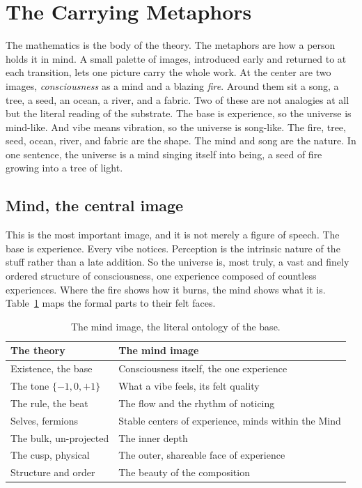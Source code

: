 \section{The Carrying Metaphors}

The mathematics is the body of the theory. The metaphors are how a person holds it in mind. A small palette of images, introduced early and returned to at each transition, lets one picture carry the whole work. At the center are two images, \emph{consciousness} as a mind and a blazing \emph{fire}. Around them sit a song, a tree, a seed, an ocean, a river, and a fabric. Two of these are not analogies at all but the literal reading of the substrate. The base is experience, so the universe is mind-like. And vibe means vibration, so the universe is song-like. The fire, tree, seed, ocean, river, and fabric are the shape. The mind and song are the nature. In one sentence, the universe is a mind singing itself into being, a seed of fire growing into a tree of light.

\subsection{Mind, the central image}

This is the most important image, and it is not merely a figure of speech. The base is experience. Every vibe notices. Perception is the intrinsic nature of the stuff rather than a late addition. So the universe is, most truly, a vast and finely ordered structure of consciousness, one experience composed of countless experiences. Where the fire shows how it burns, the mind shows what it is. Table~\ref{tab:mind-image} maps the formal parts to their felt faces.

\begin{table}[h]
\centering
\begin{tabular}{@{}ll@{}}
\toprule
The theory & The mind image \\
\midrule
Existence, the base & Consciousness itself, the one experience \\
The tone $\{-1, 0, +1\}$ & What a vibe feels, its felt quality \\
The rule, the beat & The flow and the rhythm of noticing \\
Selves, fermions & Stable centers of experience, minds within the Mind \\
The bulk, un-projected & The inner depth \\
The cusp, physical & The outer, shareable face of experience \\
Structure and order & The beauty of the composition \\
\bottomrule
\end{tabular}
\caption{The mind image, the literal ontology of the base.}
\label{tab:mind-image}
\end{table}

